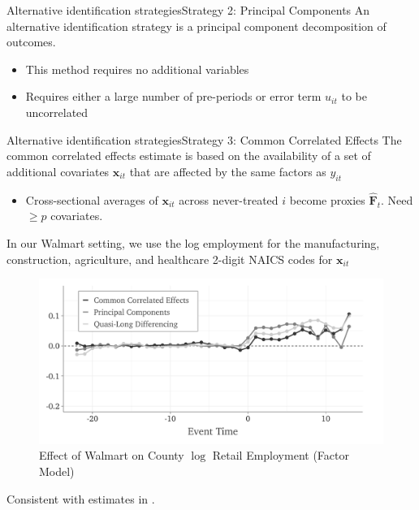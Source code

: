 \documentclass[aspectratio=43,t,11pt]{beamer}
\begin{document}
\begin{frame}{Alternative identification strategies}{Strategy 2: Principal Components}
  An alternative identification strategy is a principal component decomposition of outcomes. 
  \begin{itemize}
    \item This method requires no additional variables
    \item Requires either a large number of pre-periods \citecolor{[\citet{Xu_2017}]} or error term $u_{it}$ to be uncorrelated 
  \end{itemize} 

\end{frame}

\begin{frame}{Alternative identification strategies}{Strategy 3: Common Correlated Effects}
  The common correlated effects estimate is based on the availability of a set of additional covariates $\bm{x}_{it}$ that are affected by the same factors as $y_{it}$ 
  
  \begin{itemize}
    \item Cross-sectional averages of $\bm{x}_{it}$ across never-treated $i$ become proxies $\hat{\bm{F}}_t$. Need $\geq p$ covariates.
  \end{itemize}

  \bigskip
  In our Walmart setting, we use the log employment for the manufacturing, construction, agriculture, and healthcare 2-digit NAICS codes for $\bm{x}_{it}$

\end{frame}

\begin{frame}{}
  \vspace{-\bigskipamount}
  \begin{figure}
    \caption{Effect of Walmart on County $\log$ Retail Employment (Factor Model)}
    \begin{adjustbox}{width=\textwidth}
      \includegraphics{../figures/plot_retail_many_estimators.pdf}
    \end{adjustbox}
  \end{figure}

  Consistent with estimates in \citet{basker2005job}.
\end{frame}
\end{document}
